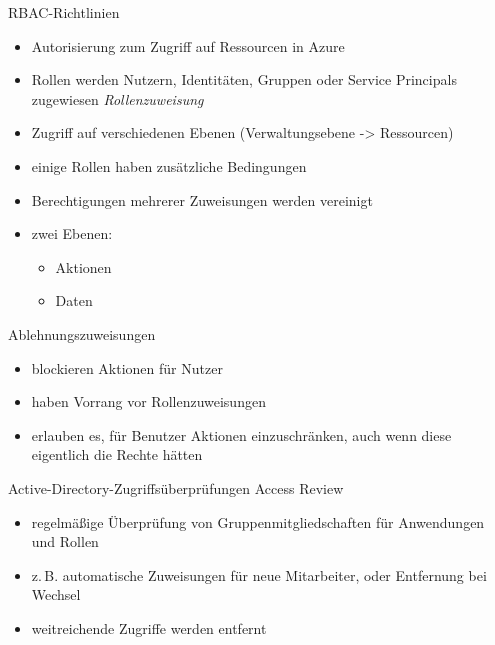 \begin{flashcard}[Definition]{RBAC-Richtlinien}
  \begin{itemize}
    \item Autorisierung zum Zugriff auf Ressourcen in Azure
    \item Rollen werden Nutzern, Identitäten, Gruppen oder Service Principals zugewiesen\newline
      \emph{Rollenzuweisung}
    \item Zugriff auf verschiedenen Ebenen (Verwaltungsebene -> Ressourcen)
    \item einige Rollen haben zusätzliche Bedingungen
    \item Berechtigungen mehrerer Zuweisungen werden vereinigt
    \item zwei Ebenen:
      \begin{itemize}
        \item Aktionen
        \item Daten
      \end{itemize}
  \end{itemize}
\end{flashcard}

\begin{flashcard}[Definition]{Ablehnungszuweisungen}
  \begin{itemize}
    \item blockieren Aktionen für Nutzer
    \item haben Vorrang vor Rollenzuweisungen
    \item erlauben es, für Benutzer Aktionen einzuschränken,\newline
      auch wenn diese eigentlich die Rechte hätten
  \end{itemize}
\end{flashcard}

\begin{flashcard}[Definition]{Active-Directory-Zugriffsüberprüfungen}
  Access Review
  \begin{itemize}
    \item regelmäßige Überprüfung von Gruppenmitgliedschaften für Anwendungen und Rollen
    \item z.\,B. automatische Zuweisungen für neue Mitarbeiter, oder Entfernung bei Wechsel
    \item weitreichende Zugriffe werden entfernt
  \end{itemize}
\end{flashcard}

